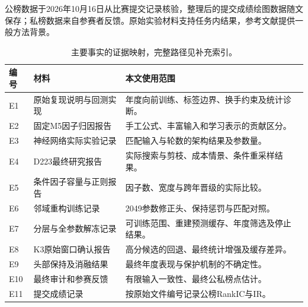 \documentclass[UTF8,11pt,a4paper,fontset=fandol]{ctexart}
\begin{document}
公榜数据于2026年10月16日从比赛提交记录核验，整理后的提交成绩绘图数据随文保存；私榜数据来自参赛者反馈。原始实验材料支持任务内结果，参考文献提供一般方法背景。

\begin{table}[H]\centering\small
\caption{主要事实的证据映射，完整路径见补充索引。}\label{tab:sources}
\begin{tabularx}{\linewidth}{p{1cm}p{4.3cm}X}\toprule
编号 & 材料 & 本文使用范围\\\midrule
E1 & 原始复现说明与回测实现 & 年度向前训练、标签边界、换手约束及统计诊断。\\
E2 & 固定M5因子归因报告 & 手工公式、丰富输入和学习表示的贡献区分。\\
E3 & 神经网络实际实验记录 & 匹配输入与轮数的架构结果及参数量。\\
E4 & D223最终研究报告 & 实际搜索与剪枝、成本情景、条件重采样结果。\\
E5 & 条件因子容量与正则报告 & 因子数、宽度与跨年晋级的实际比较。\\
E6 & 邻域重构训练记录 & 2049参数修正头、保持惩罚与匹配对照。\\
E7 & 分层与全参数解冻记录 & 可训练范围、重建预测缓存、年度筛选及停止结果。\\
E8 & K3原始窗口确认报告 & 高分候选的回退、最终统计增强及缓存差异。\\
E9 & 头部保持及消融结果 & 最终年度表现与保护机制的不确定性。\\
E10 & 最终审计和参赛反馈 & 有限输入一致性、最终公私榜点估计。\\
E11 & 提交成绩记录 & 按原始文件编号记录公榜RankIC与IR。\\\bottomrule
\end{tabularx}
\end{table}
\end{document}

